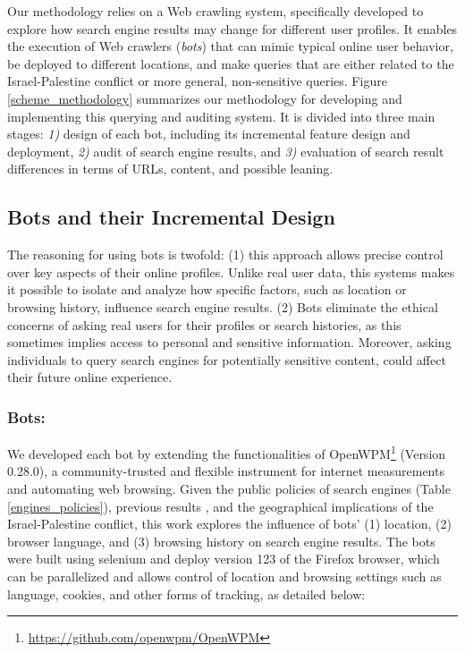 Our methodology relies on a Web crawling system, specifically developed to explore how search engine results may change for different user profiles. It enables the execution of Web crawlers (\textit{bots}) that can mimic typical online user behavior, be deployed to different locations, and make queries that are either related to the Israel-Palestine conflict or more general, non-sensitive queries. Figure \ref{scheme_methodology} summarizes our methodology for developing and implementing this querying and auditing system. It is divided into three main stages: \textit{1)} design of each bot, including its incremental feature design and deployment, \textit{2)} audit of search engine results, and \textit{3)} evaluation of search result differences in terms of URLs, content, and possible leaning.

\subsection{Bots and their Incremental Design}
The reasoning for using bots is twofold: (1) this approach allows precise control over key aspects of their online profiles. Unlike real user data, this systems makes it possible to isolate and analyze how specific factors, such as location or browsing history, influence search engine results. (2) Bots eliminate the ethical concerns of asking real users for their profiles or search histories, as this sometimes implies access to personal and sensitive information. Moreover, asking individuals to query search engines for potentially sensitive content, could affect their future online experience.

\subsubsection{Bots:} We developed each bot by extending the functionalities of OpenWPM\footnote{\url{https://github.com/openwpm/OpenWPM}} (Version 0.28.0), a community-trusted and flexible instrument for internet measurements and automating web browsing\cite{englehardt2016census}. 
Given the public policies of search engines (Table \ref{engines_policies}), previous results \cite{inconsistent_search_results, partisan_audience_bias, political_personalization}, and the geographical implications of the Israel-Palestine conflict, this work explores the influence of bots' (1) location, (2) browser language, and (3) browsing history on search engine results.
The bots were built using selenium and deploy version 123 of the Firefox browser, which can be parallelized and allows control of location and browsing settings such as language, cookies, and other forms of tracking, as detailed below:

